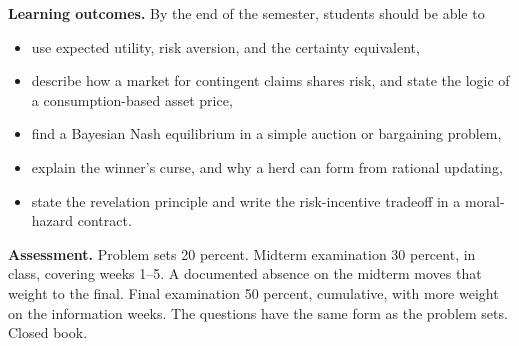 \documentclass[11pt]{article}
\begin{document}
\textbf{Learning outcomes.}
By the end of the semester, students should be able to
\begin{itemize}
\item use expected utility, risk aversion, and the certainty equivalent,
\item describe how a market for contingent claims shares risk, and state the logic of a consumption-based asset price,
\item find a Bayesian Nash equilibrium in a simple auction or bargaining problem,
\item explain the winner's curse, and why a herd can form from rational updating,
\item state the revelation principle and write the risk-incentive tradeoff in a moral-hazard contract.
\end{itemize}

\textbf{Assessment.}
Problem sets 20 percent. Midterm examination 30 percent, in class, covering weeks 1--5. A documented absence on the midterm moves that weight to the final. Final examination 50 percent, cumulative, with more weight on the information weeks. The questions have the same form as the problem sets. Closed book.
\end{document}
